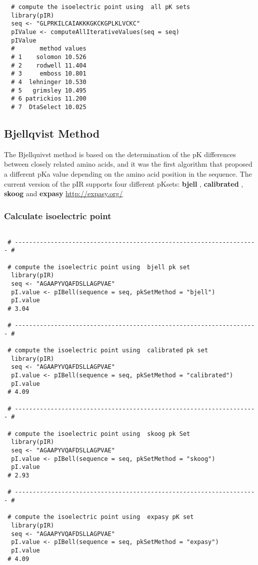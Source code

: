 \documentclass{article}
\begin{document}
\begin{verbatim}
  # compute the isoelectric point using  all pK sets
  library(pIR)
  seq <- "GLPRKILCAIAKKKGKCKGPLKLVCKC"
  pIValue <- computeAllIterativeValues(seq = seq)
  pIValue
  #       method values
  # 1    solomon 10.526
  # 2    rodwell 11.404
  # 3     emboss 10.801
  # 4  lehninger 10.530
  # 5   grimsley 10.495
  # 6 patrickios 11.200
  # 7  DtaSelect 10.025

\end{verbatim}

\subsection{Bjellqvist Method}

The Bjellquivst method \cite{bjellqvist1993} is based on the determination of the pK differences between closely related amino acids, and it was the first algorithm that proposed a different pKa value depending on the amino acid position in the sequence. The current version of the pIR supports four different pKsets: \textbf{bjell} \cite{bjellqvist1993},  \textbf{calibrated} \cite{gauci2008}, \textbf{skoog} and \textbf{expasy} \url{http://expasy.org/}

\subsubsection{Calculate isoelectric point}

\begin{verbatim}

 # -------------------------------------------------------------------- #

 # compute the isoelectric point using  bjell pk set
  library(pIR)
  seq <- "AGAAPYVQAFDSLLAGPVAE"
  pI.value <- pIBell(sequence = seq, pkSetMethod = "bjell")
  pI.value
 # 3.04

 # -------------------------------------------------------------------- #

 # compute the isoelectric point using  calibrated pk set
  library(pIR)
  seq <- "AGAAPYVQAFDSLLAGPVAE"
  pI.value <- pIBell(sequence = seq, pkSetMethod = "calibrated")
  pI.value
 # 4.09

 # -------------------------------------------------------------------- #

 # compute the isoelectric point using  skoog pk Set
  library(pIR)
  seq <- "AGAAPYVQAFDSLLAGPVAE"
  pI.value <- pIBell(sequence = seq, pkSetMethod = "skoog")
  pI.value
 # 2.93

 # -------------------------------------------------------------------- #

 # compute the isoelectric point using  expasy pK set
  library(pIR)
  seq <- "AGAAPYVQAFDSLLAGPVAE"
  pI.value <- pIBell(sequence = seq, pkSetMethod = "expasy")
  pI.value
 # 4.09

\end{verbatim}
\end{document}
